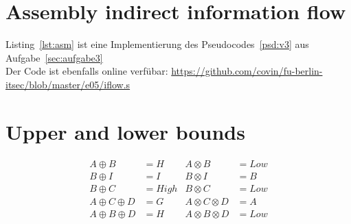 \section{Assembly indirect information flow}
Listing~\ref{lst:asm} ist eine Implementierung des Pseudocodes~\ref{psd:v3} aus
Aufgabe~\ref{sec:aufgabe3}\\
Der Code ist ebenfalls online verfübar:
\url{https://github.com/covin/fu-berlin-itsec/blob/master/e05/iflow.s}



\section{Upper and lower bounds}

\begin{equation}
\begin{aligned}
A \oplus B &= H          & A \otimes B &= Low \\
B \oplus I &= I          & B \otimes I &= B \\
B \oplus C &= High       & B \otimes C &= Low \\
A \oplus C \oplus D &= G & A \otimes C \otimes D &= A \\
A \oplus B \oplus D &= H & A \otimes B \otimes D &= Low
\end{aligned}
\end{equation}


